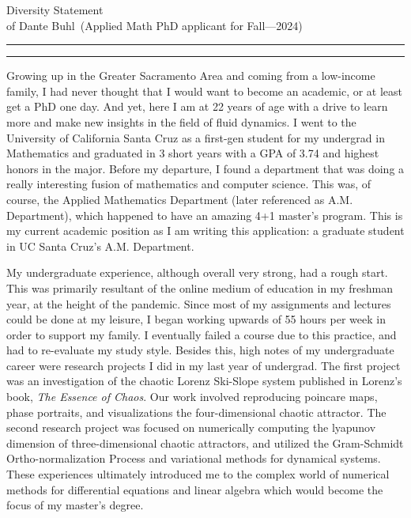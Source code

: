 \documentclass{article}
\newcommand{\soptitle}{Diversity Statement}
\newcommand{\yourname}{Dante Buhl}
\begin{document}
\begin{center}\LARGE\soptitle\\
\large of \yourname\ (Applied Math PhD applicant for Fall---2024)
\end{center}

\hrule
\vspace{1pt}
\hrule height 1pt

\bigskip

\large
Growing up in the Greater Sacramento Area and coming from a low-income family, I had never thought that I would want to become an academic, or at least get a PhD one day. And yet, here I am at 22 years of age with a drive to learn more and make new insights in the field of fluid dynamics. I went to the University of California Santa Cruz as a first-gen student for my undergrad in Mathematics and graduated in 3 short years with a GPA of 3.74 and highest honors in the major. Before my departure, I found a department that was doing a really interesting fusion of mathematics and computer science. This was, of course, the Applied Mathematics Department (later referenced as A.M. Department), which happened to have an amazing 4+1 master's program. This is my current academic position as I am writing this application: a graduate student in UC Santa Cruz's A.M. Department. 

My undergraduate experience, although overall very strong, had a rough start. This was primarily resultant of the online medium of education in my freshman year, at the height of the pandemic. Since most of my assignments and lectures could be done at my leisure, I began working upwards of 55 hours per week in order to support my family. I eventually failed a course due to this practice, and had to re-evaluate my study style. Besides this, high notes of my undergraduate career were research projects I did in my last year of undergrad. The first project was an investigation of the chaotic Lorenz Ski-Slope system published in Lorenz's book, \textit{The Essence of Chaos}. Our work involved reproducing poincare maps, phase portraits, and visualizations the four-dimensional chaotic attractor. The second research project was focused on numerically computing the lyapunov dimension of three-dimensional chaotic attractors, and utilized the Gram-Schmidt Ortho-normalization Process and variational methods for dynamical systems. These experiences ultimately introduced me to the complex world of numerical methods for differential equations and linear algebra which would become the focus of my master's degree. 
\end{document}

